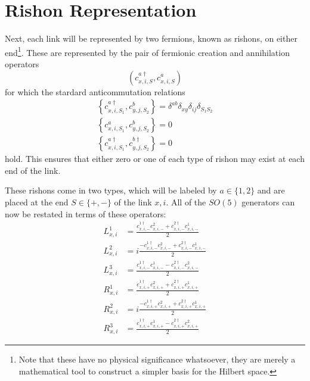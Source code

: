 \documentclass[a4paper,oneside, 11pt,english,listof=totoc,bibliography=totoc]{scrbook}
\begin{document}
\section{Rishon Representation}
Next, each link will be represented by two fermions, known as rishons, on either end\footnote{Note that these have no physical significance whatsoever, they are merely a mathematical tool to construct a simpler basis for the Hilbert space.}. These are represented by the pair of fermionic creation and annihilation operators
\begin{equation}\label{eq:rishon}
    \left(c^{a\dagger}_{x,i,S}, c^a_{x,i,S}\right)
\end{equation}
for which the stardard anticommutation relations
\begin{equation}\label{eq:ac-rishon}
    \begin{array}{l}
        \left\{c^{a\dagger}_{x,i,S_1},c^b_{y,j,S_2}\right\}=\delta^{ab}\delta_{xy}\delta_{ij}\delta_{S_1S_2} \\
        \left\{c^a_{x,i,S_1},c^b_{y,j,S_2}\right\}=0 \\
        \left\{c^{a\dagger}_{x,i,S_1},c^{b\dagger}_{y,j,S_2}\right\}=0
    \end{array}
\end{equation}
hold. This ensures that either zero or one of each type of rishon may exist at each end of the link.

These rishons come in two types, which will be labeled by $a\in\{1,2\}$ and are placed at the end $S\in\{+,-\}$ of the link $x,i$. All of the $SO(5)$ generators can now be restated in terms of these operators:
\begin{align*}
    L^1_{x,i}&=\frac{c^{1\dagger}_{x,i,-}c^2_{x,i,-}+c^{2\dagger}_{x,i,-}c^1_{x,i,-}}{2} \\
    L^2_{x,i}&=i\frac{-c^{1\dagger}_{x,i,-}c^2_{x,i,-}+c^{2\dagger}_{x,i,-}c^1_{x,i,-}}{2} \\
    L^3_{x,i}&=\frac{c^{1\dagger}_{x,i,-}c^1_{x,i,-}-c^{2\dagger}_{x,i,-}c^2_{x,i,-}}{2} \\
    R^1_{x,i}&=\frac{c^{1\dagger}_{x,i,+}c^2_{x,i,+}+c^{2\dagger}_{x,i,+}c^1_{x,i,+}}{2} \\
    R^2_{x,i}&=i\frac{-c^{1\dagger}_{x,i,+}c^2_{x,i,+}+c^{2\dagger}_{x,i,+}c^1_{x,i,+}}{2} \\
    R^3_{x,i}&=\frac{c^{1\dagger}_{x,i,+}c^1_{x,i,+}-c^{2\dagger}_{x,i,+}c^2_{x,i,+}}{2}
\end{align*}
\end{document}
